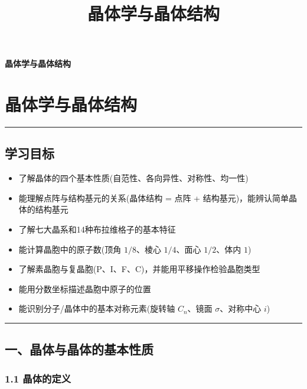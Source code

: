 \documentclass[a4paper,11pt]{ctexart}
\title{晶体学与晶体结构}
\date{}
\providecommand{\tightlist}{\setlength{\itemsep}{0pt}\setlength{\parskip}{0pt}}
\newcommand{\箭}{\ensuremath{\rightarrow}}
\newcommand{\左箭}{\ensuremath{\leftarrow}}
\newcommand{\上箭}{\ensuremath{\uparrow}}
\newcommand{\下箭}{\ensuremath{\downarrow}}
\newcommand{\衡}{\ensuremath{\rightleftharpoons}}
\newcommand{\双箭}{\ensuremath{\leftrightarrow}}
\newcommand{\约等于}{\ensuremath{\approx}}
\newcommand{\小于等于}{\ensuremath{\leq}}
\newcommand{\大于等于}{\ensuremath{\geq}}
\newcommand{\不等于}{\ensuremath{\neq}}
\newcommand{\西格马}{\ensuremath{\sigma}}
\newcommand{\派}{\ensuremath{\pi}}
\begin{document}
\thispagestyle{plain}
\begin{center}
{\bfseries 晶体学与晶体结构\par}
\end{center}
\vspace{1em}
\section{晶体学与晶体结构}\label{ux6676ux4f53ux5b66ux4e0eux6676ux4f53ux7ed3ux6784}

\begin{center}\rule{0.5\linewidth}{0.5pt}\end{center}

\subsection{学习目标}\label{ux5b66ux4e60ux76eeux6807}

\begin{itemize}
\tightlist
\item
  了解晶体的四个基本性质(自范性、各向异性、对称性、均一性)
\item
  能理解点阵与结构基元的关系(晶体结构 = 点阵 + 结构基元)，能辨认简单晶体的结构基元
\item
  了解七大晶系和14种布拉维格子的基本特征
\item
  能计算晶胞中的原子数(顶角 \(1/8\)、棱心 \(1/4\)、面心 \(1/2\)、体内 \(1\))
\item
  了解素晶胞与复晶胞(P、I、F、C)，并能用平移操作检验晶胞类型
\item
  能用分数坐标描述晶胞中原子的位置
\item
  能识别分子/晶体中的基本对称元素(旋转轴 \(C_n\)、镜面 \(\sigma\)、对称中心 \(i\))
\end{itemize}

\begin{center}\rule{0.5\linewidth}{0.5pt}\end{center}

\subsection{一、晶体与晶体的基本性质}\label{ux4e00ux6676ux4f53ux4e0eux6676ux4f53ux7684ux57faux672cux6027ux8d28}

\subsubsection{1.1 晶体的定义}\label{ux6676ux4f53ux7684ux5b9aux4e49}
\end{document}

